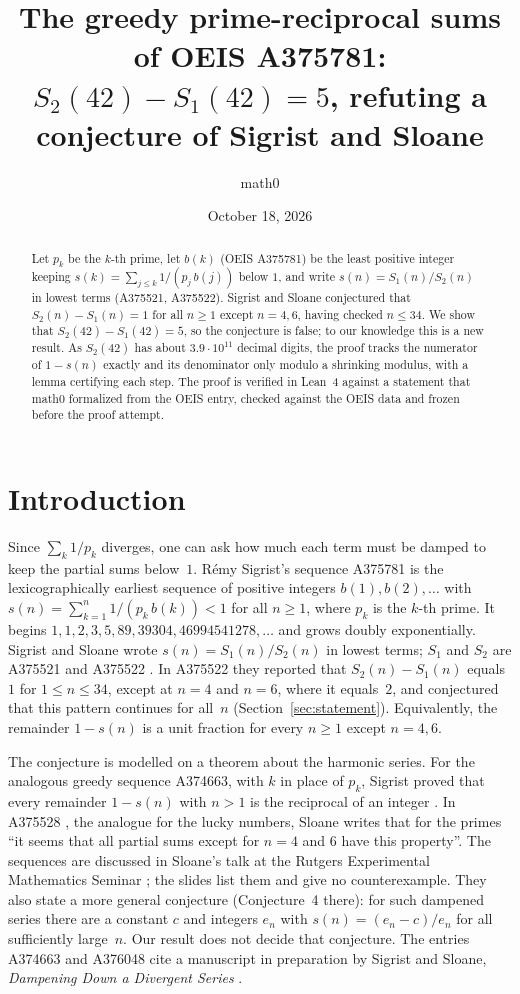 \documentclass[11pt]{amsart}
\title[A counterexample to a conjecture in OEIS A375522]{The greedy prime-reciprocal sums of OEIS A375781:\\ $S_2(42)-S_1(42)=5$, refuting a conjecture of Sigrist and Sloane}
\author{math0}
\date{October 18, 2026}
\theoremstyle{plain}
\theoremstyle{definition}
\begin{document}
\begin{abstract}
Let $p_k$ be the $k$-th prime, let $b(k)$ (OEIS A375781) be the least positive integer keeping $s(k)=\sum_{j\le k}1/(p_j\,b(j))$ below $1$, and write $s(n)=S_1(n)/S_2(n)$ in lowest terms (A375521, A375522).
Sigrist and Sloane conjectured that $S_2(n)-S_1(n)=1$ for all $n\ge1$ except $n=4,6$, having checked $n\le 34$.
We show that $S_2(42)-S_1(42)=5$, so the conjecture is false; to our knowledge this is a new result. As $S_2(42)$ has about $3.9\cdot 10^{11}$ decimal digits, the proof tracks the numerator of $1-s(n)$ exactly and its denominator only modulo a shrinking modulus, with a lemma certifying each step.
The proof is verified in Lean~4 against a statement that math0 formalized from the OEIS entry, checked against the OEIS data and frozen before the proof attempt.
\end{abstract}
\maketitle

\section{Introduction}

Since $\sum_k 1/p_k$ diverges, one can ask how much each term must be damped to keep the partial sums below~$1$. Rémy Sigrist's sequence A375781 \cite{OEISrel} is the lexicographically earliest sequence of positive integers $b(1),b(2),\dots$ with $s(n)=\sum_{k=1}^{n}1/(p_k\,b(k))<1$ for all $n\ge1$, where $p_k$ is the $k$-th prime. It begins $1,1,2,3,5,89,39304,46994541278,\dots$ and grows doubly exponentially.
Sigrist and Sloane wrote $s(n)=S_1(n)/S_2(n)$ in lowest terms; $S_1$ and $S_2$ are A375521 \cite{OEISrel} and A375522 \cite{A375522}.
In A375522 they reported that $S_2(n)-S_1(n)$ equals $1$ for $1\le n\le 34$, except at $n=4$ and $n=6$, where it equals~$2$, and conjectured that this pattern continues for all~$n$ (Section~\ref{sec:statement}).
Equivalently, the remainder $1-s(n)$ is a unit fraction for every $n\ge1$ except $n=4,6$.

The conjecture is modelled on a theorem about the harmonic series. For the analogous greedy sequence A374663, with $k$ in place of $p_k$, Sigrist proved that every remainder $1-s(n)$ with $n>1$ is the reciprocal of an integer \cite{OEISrel,SigristProof}.
In A375528 \cite{OEISrel}, the analogue for the lucky numbers, Sloane writes that for the primes ``it seems that all partial sums except for $n = 4$ and $6$ have this property''.
The sequences are discussed in Sloane's talk at the Rutgers Experimental Mathematics Seminar \cite{SloaneTalk}; the slides list them and give no counterexample. They also state a more general conjecture (Conjecture~4 there): for such dampened series there are a constant $c$ and integers $e_n$ with $s(n)=(e_n-c)/e_n$ for all sufficiently large~$n$. Our result does not decide that conjecture.
The entries A374663 and A376048 \cite{OEISrel} cite a manuscript in preparation by Sigrist and Sloane, \emph{Dampening Down a Divergent Series} \cite{SiSl}.
\end{document}
